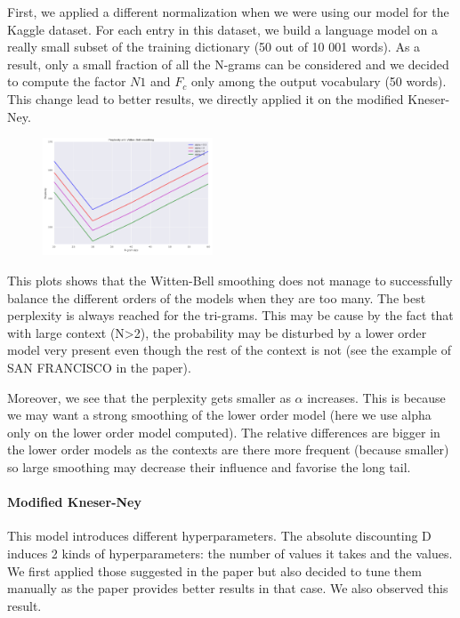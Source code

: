 \documentclass[11pt]{article}
\begin{document}
First, we applied a different normalization when we were using our model for the Kaggle dataset. For each entry in this dataset, we build a language model on a really small subset of the training dictionary (50 out of 10 001 words). As a result, only a small fraction of all the N-grams can be considered and we decided to compute the factor $N1$ and $F_c$ only among the output vocabulary (50 words). This change lead to better results, we directly applied it on the modified Kneser-Ney.

\begin{figure}[H]
  \centering
  \includegraphics[width=0.45\textwidth]{perp_wb}
\end{figure}

This plots shows that the Witten-Bell smoothing does not manage to successfully balance the different orders of the models when they are too many. The best perplexity is always reached for the tri-grams. This may be cause by the fact that with large context (N>2), the probability may be disturbed by a lower order model very present even though the rest of the context is not (see the example of SAN FRANCISCO in the paper).

Moreover, we see that the perplexity gets smaller as $\alpha$ increases. This is because we may want a strong smoothing of the lower order model (here we use alpha only on the lower order model computed). The relative differences are bigger in the lower order models as the contexts are there more frequent (because smaller) so large smoothing may decrease their influence and favorise the long tail.

\paragraph{Modified Kneser-Ney}

This model introduces different hyperparameters. The absolute discounting D induces 2 kinds of hyperparameters: the number of values it takes and the values. We first applied those suggested in the paper but also decided to tune them manually as the paper provides better results in that case. We also observed this result.
\end{document}
